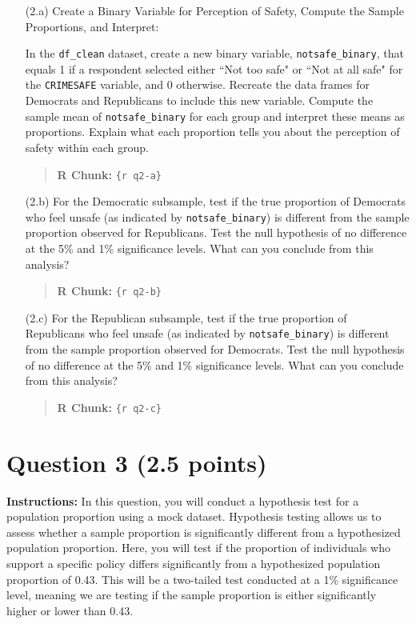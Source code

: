 \documentclass[11pt]{article}
\begin{document}
\begin{itemize}
    \item[(2.a)] Create a Binary Variable for Perception of Safety, Compute the Sample Proportions, and Interpret:
    
    In the \texttt{df\_clean} dataset, create a new binary variable, \texttt{notsafe\_binary}, that equals 1 if a respondent selected either ``Not too safe" or ``Not at all safe" for the \texttt{CRIMESAFE} variable, and 0 otherwise. Recreate the data frames for Democrats and Republicans to include this new variable. Compute the sample mean of \texttt{notsafe\_binary} for each group and interpret these means as proportions. Explain what each proportion tells you about the perception of safety within each group.
    \begin{quote}
    \textbf{R Chunk:} \texttt{\{r q2-a\}}
    \end{quote}

    \item[(2.b)] For the Democratic subsample, test if the true proportion of Democrats who feel unsafe (as indicated by \texttt{notsafe\_binary}) is different from the sample proportion observed for Republicans. Test the null hypothesis of no difference at the 5\% and 1\% significance levels. What can you conclude from this analysis? 
    \begin{quote}
    \textbf{R Chunk:} \texttt{\{r q2-b\}}
    \end{quote}


    \item[(2.c)] For the Republican subsample, test if the true proportion of Republicans who feel unsafe (as indicated by \texttt{notsafe\_binary}) is different from the sample proportion observed for Democrats. Test the null hypothesis of no difference at the 5\% and 1\% significance levels. What can you conclude from this analysis? 
    \begin{quote}
    \textbf{R Chunk:} \texttt{\{r q2-c\}}
    \end{quote}

\end{itemize}

\newpage
\section*{Question 3 (2.5 points)}

\textbf{Instructions:} In this question, you will conduct a hypothesis test for a population proportion using a mock dataset. Hypothesis testing allows us to assess whether a sample proportion is significantly different from a hypothesized population proportion. Here, you will test if the proportion of individuals who support a specific policy differs significantly from a hypothesized population proportion of 0.43. This will be a two-tailed test conducted at a 1\% significance level, meaning we are testing if the sample proportion is either significantly higher or lower than 0.43.
\end{document}
